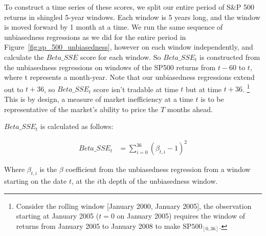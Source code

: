 To construct a time series of these scores, we split our entire period of S\&P 500 returns in shingled 5-year windows. Each window is 5 years long, and the window is moved forward by 1 month at a time.
We run the same sequence of unbiasedness regressions as we did for the entire period in Figure~\ref{fig:sp_500_unbiasedness}, however on each window independently, and calculate the $Beta\_SSE$ score for each window.
So $Beta\_SSE_t$ is constructed from the unbiasedness regressions on windows of the SP500 returns from $t-60$ to $t$, where t represents a month-year.
 Note that our unbiasedness regressions extend out to $t+36$, so $Beta\_SSE_t$ score isn't tradable at time $t$ but at time $t+36$.
\footnote{Consider the rolling window [January 2000, January 2005], the observation starting at January 2005 ($t=0$ on January 2005) requires the window of returns from January 2005 to January 2008 to make $\mathrm{SP500}_{[0, 36]}$.}
This is by design, a measure of market inefficiency at a time $t$ is to be representative of the market's ability to price the $T$ months ahead.

$Beta\_SSE_t$ is calculated as follows:

\begin{equation}
    \begin{aligned}
        Beta\_SSE_t &= \sum_{i=0}^{36} (\beta_{t,i} - 1)^2
    \end{aligned}
\end{equation}
\label{eq:beta_sse}

Where $\beta_{t,i}$ is the $\beta$ coefficient from the unbiasedness regression from a 
window starting on the date $t$, at the $i$th depth of the unbiasedness window.

